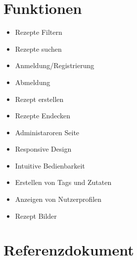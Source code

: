 \documentclass{article}
\begin{document}
\section{Funktionen}
\begin{multicols}{2}
    \begin{itemize}
        \item Rezepte Filtern
        \item Rezepte suchen
        \item Anmeldung/Registrierung
        \item Abmeldung
        \item Rezept erstellen
        \item Rezepte Endecken
        \item Administaroren Seite
        \item Responsive Design
        \item Intuitive Bedienbarkeit
        \item Erstellen von Tags und Zutaten
        \item Anzeigen von Nutzerprofilen
        \item Rezept Bilder
    \end{itemize}
\end{multicols}

\pagebreak
\section{Referenzdokument}
\end{document}
